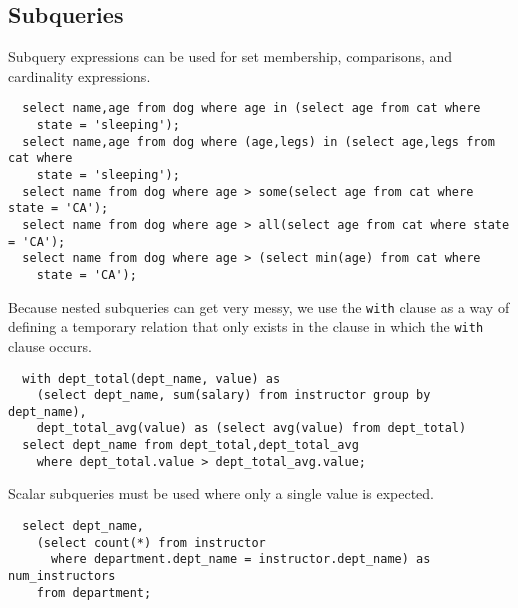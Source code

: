 \documentclass{math}
\begin{document}
\subsection*{Subqueries}
Subquery expressions can be used for set membership, comparisons, and
cardinality expressions.
\begin{lstlisting}
  select name,age from dog where age in (select age from cat where
    state = 'sleeping');
  select name,age from dog where (age,legs) in (select age,legs from cat where
    state = 'sleeping');
  select name from dog where age > some(select age from cat where state = 'CA');
  select name from dog where age > all(select age from cat where state = 'CA');
  select name from dog where age > (select min(age) from cat where
    state = 'CA');
\end{lstlisting}
Because nested subqueries can get very messy, we use the \texttt{with} clause
as a way of defining a temporary relation that only exists in the clause in
which the \texttt{with} clause occurs.
\begin{lstlisting}
  with dept_total(dept_name, value) as
    (select dept_name, sum(salary) from instructor group by dept_name),
    dept_total_avg(value) as (select avg(value) from dept_total)
  select dept_name from dept_total,dept_total_avg
    where dept_total.value > dept_total_avg.value;
\end{lstlisting}
Scalar subqueries must be used where only a single value is expected.
\begin{lstlisting}
  select dept_name,
    (select count(*) from instructor
      where department.dept_name = instructor.dept_name) as num_instructors
    from department;
\end{lstlisting}
\end{document}
